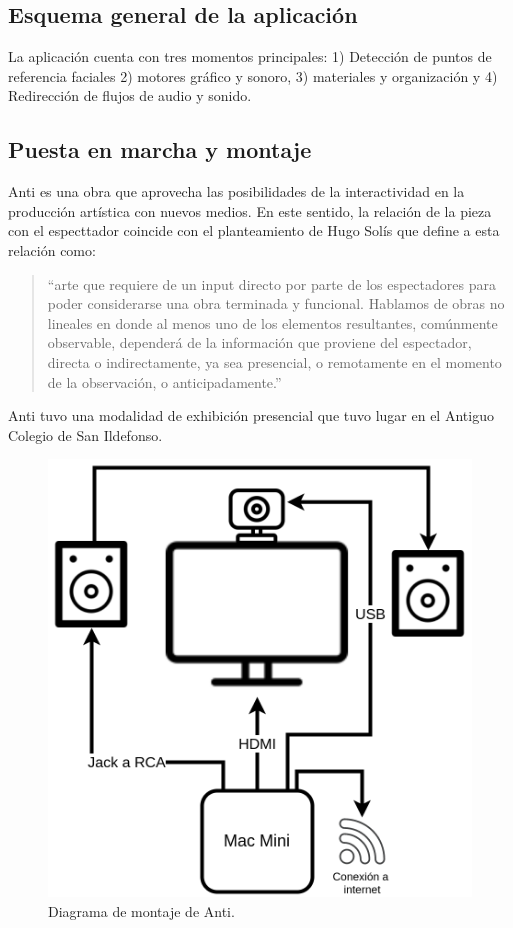 \subsection{Esquema general de la aplicación}

La aplicación cuenta con tres momentos principales: 1) Detección de puntos de referencia faciales 2) motores gráfico y sonoro, 3) materiales y organización y 4) Redirección de flujos de audio y sonido.  

\subsection{Puesta en marcha y montaje}

Anti es una obra que aprovecha las posibilidades de la interactividad en la producción artística con nuevos medios. En este sentido, la relación de la pieza con el especttador coincide con el planteamiento de Hugo Solís que define a esta relación como:

\begin{quote}

``arte que requiere de un input directo por parte de los espectadores para poder considerarse una obra terminada y funcional. Hablamos de obras no lineales en donde al menos uno de los elementos resultantes, comúnmente observable, dependerá de la información que proviene del espectador, directa o indirectamente, ya sea presencial, o remotamente en el momento de la observación, o anticipadamente.''\citep[p.~37]{hugoSolis}

\end{quote}
  
Anti tuvo una modalidad de exhibición presencial que tuvo lugar en el Antiguo Colegio de San Ildefonso.

\begin{figure}[tb]
\centering 
\includegraphics[width=0.7\columnwidth]{img/antiExWhite.png} 
\caption[Diagrama de Montaje Anti]{Diagrama de montaje de Anti.} %
\label{fig:gallery} 
\end{figure}

